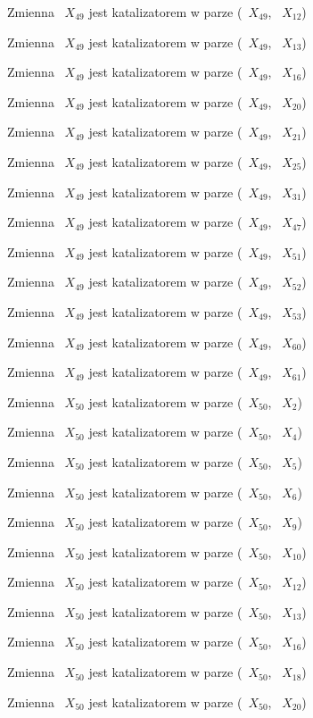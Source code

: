 \documentclass{article}
\begin{document}
Zmienna ~$X_{49}$ jest katalizatorem w parze (~$X_{49}$, ~$X_{12}$)

Zmienna ~$X_{49}$ jest katalizatorem w parze (~$X_{49}$, ~$X_{13}$)

Zmienna ~$X_{49}$ jest katalizatorem w parze (~$X_{49}$, ~$X_{16}$)

Zmienna ~$X_{49}$ jest katalizatorem w parze (~$X_{49}$, ~$X_{20}$)

Zmienna ~$X_{49}$ jest katalizatorem w parze (~$X_{49}$, ~$X_{21}$)

Zmienna ~$X_{49}$ jest katalizatorem w parze (~$X_{49}$, ~$X_{25}$)

Zmienna ~$X_{49}$ jest katalizatorem w parze (~$X_{49}$, ~$X_{31}$)

Zmienna ~$X_{49}$ jest katalizatorem w parze (~$X_{49}$, ~$X_{47}$)

Zmienna ~$X_{49}$ jest katalizatorem w parze (~$X_{49}$, ~$X_{51}$)

Zmienna ~$X_{49}$ jest katalizatorem w parze (~$X_{49}$, ~$X_{52}$)

Zmienna ~$X_{49}$ jest katalizatorem w parze (~$X_{49}$, ~$X_{53}$)

Zmienna ~$X_{49}$ jest katalizatorem w parze (~$X_{49}$, ~$X_{60}$)

Zmienna ~$X_{49}$ jest katalizatorem w parze (~$X_{49}$, ~$X_{61}$)

Zmienna ~$X_{50}$ jest katalizatorem w parze (~$X_{50}$, ~$X_{2}$)

Zmienna ~$X_{50}$ jest katalizatorem w parze (~$X_{50}$, ~$X_{4}$)

Zmienna ~$X_{50}$ jest katalizatorem w parze (~$X_{50}$, ~$X_{5}$)

Zmienna ~$X_{50}$ jest katalizatorem w parze (~$X_{50}$, ~$X_{6}$)

Zmienna ~$X_{50}$ jest katalizatorem w parze (~$X_{50}$, ~$X_{9}$)

Zmienna ~$X_{50}$ jest katalizatorem w parze (~$X_{50}$, ~$X_{10}$)

Zmienna ~$X_{50}$ jest katalizatorem w parze (~$X_{50}$, ~$X_{12}$)

Zmienna ~$X_{50}$ jest katalizatorem w parze (~$X_{50}$, ~$X_{13}$)

Zmienna ~$X_{50}$ jest katalizatorem w parze (~$X_{50}$, ~$X_{16}$)

Zmienna ~$X_{50}$ jest katalizatorem w parze (~$X_{50}$, ~$X_{18}$)

Zmienna ~$X_{50}$ jest katalizatorem w parze (~$X_{50}$, ~$X_{20}$)
\end{document}
